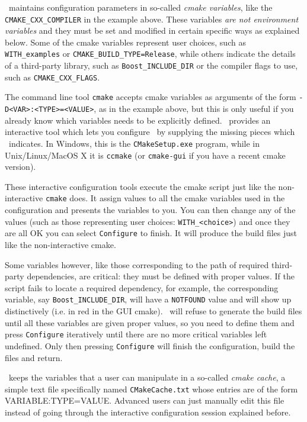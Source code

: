 \cmake\ maintains configuration parameters in so-called {\em cmake variables}, like the \texttt{CMAKE\_CXX\_COMPILER}
in the example above. These variables {\em are not environment variables} and they must be set and modified in
certain specific ways as explained below. Some of the cmake variables represent user choices, such as
\texttt{WITH\_examples} or \texttt{CMAKE\_BUILD\_TYPE=Release}, while others indicate the details of a third-party library, 
such as \texttt{Boost\_INCLUDE\_DIR} or the compiler flags to use, such as \texttt{CMAKE\_CXX\_FLAGS}. 

The command line tool \texttt{cmake} accepts cmake variables as arguments of the form \texttt{-D<VAR>:<TYPE>=<VALUE>}, as
in the example above, but this is only useful if you already know which variables needs to be explicitly defined.
\cmake\ provides an interactive tool which lets you configure \cgal\ by supplying the missing pieces 
which \cmake\ indicates. In Windows, this is the \texttt{CMakeSetup.exe} program, while in Unix/Linux/MacOS X it is \texttt{ccmake}
(or \texttt{cmake-gui} if you have a recent cmake version). 

These interactive configuration tools execute the cmake script just like the non-interactive \texttt{cmake} does. It assign
values to all the cmake variables used in the configuration and presents the variables to you. You can then change 
any of the values (such as those representing user choices: \texttt{WITH\_<choice>}) and once they are all OK you can select 
\texttt{Configure} to finish. It will produce the build files just like the non-interactive cmake.

Some variables however, like those corresponding to the path of required third-party dependencies, are critical: they 
must be defined with proper values. If the script fails to locate a required dependency, for example, the corresponding variable,
say \texttt{Boost\_INCLUDE\_DIR}, will have a \texttt{NOTFOUND} value and will show up distinctively (i.e. in red in the GUI cmake).
\cmake\ will refuse to generate the build files until all these variables are given proper values, so you need
to define them and press \texttt{Configure} iteratively until there are no more critical variables left undefined. Only then
pressing \texttt{Configure} will finish the configuration, build the files and return.

\begin{ccAdvanced}
\cmake\ keeps the variables that a user can manipulate in a so-called {\em cmake cache}, a simple text file specifically 
named \texttt{CMakeCache.txt} whose entries are of the form VARIABLE:TYPE=VALUE. Advanced users can just manually edit this 
file instead of going through the interactive configuration session explained before.
\end{ccAdvanced}


